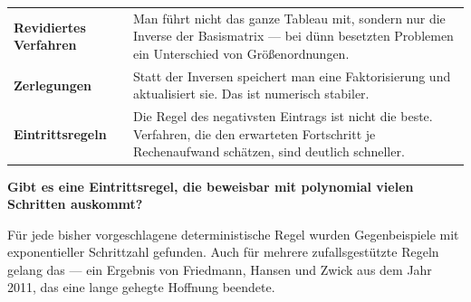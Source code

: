 \begin{geschichte}
\begin{center}
\begin{minipage}{0.9\textwidth}
\end{minipage}
\end{center}
\end{geschichte}

\begin{forschung}
\begin{center}
{\small
\renewcommand{\arraystretch}{1.45}
\begin{tabular}{@{}P{2.8cm}P{5.4cm}@{}}
\toprule
\textbf{Revidiertes Verfahren} & Man führt nicht das ganze Tableau mit, sondern nur die Inverse der Basismatrix --- bei dünn besetzten Problemen ein Unterschied von Größenordnungen.\\
\textbf{Zerlegungen} & Statt der Inversen speichert man eine Faktorisierung und aktualisiert sie. Das ist numerisch stabiler.\\
\textbf{Eintrittsregeln} & Die Regel des negativsten Eintrags ist nicht die beste. Verfahren, die den erwarteten Fortschritt je Rechenaufwand schätzen, sind deutlich schneller.\\
\bottomrule
\end{tabular}}
\end{center}

\begin{center}
\begin{minipage}{0.88\textwidth}
\end{minipage}
\end{center}

\begin{center}
\begin{minipage}{0.9\textwidth}
\textbf{Gibt es eine Eintrittsregel, die beweisbar mit polynomial vielen Schritten auskommt?}
\end{minipage}
\end{center}

Für jede bisher vorgeschlagene deterministische Regel wurden Gegenbeispiele mit exponentieller Schrittzahl gefunden. Auch für mehrere zufallsgestützte Regeln gelang das --- ein Ergebnis von Friedmann, Hansen und Zwick aus dem Jahr 2011, das eine lange gehegte Hoffnung beendete.


\end{forschung}
